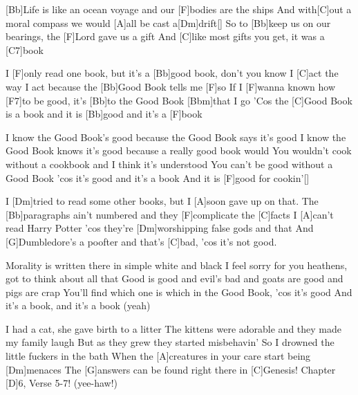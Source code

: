 

\begin{guitar}
	\small {}
	[Bb]Life is like an ocean voyage and our [F]bodies are the ships
	And with[C]out a moral compass we would [A]all be cast a[Dm]drift[]{}
	So to [Bb]keep us on our bearings, the [F]Lord gave us a gift
	And [C]like most gifts you get, it was a [C7]book
	
	I [F]only read one book, but it's a [Bb]good book, don't you know
	I [C]act the way I act because the [Bb]Good Book tells me [F]so
	If I [F]wanna known how [F7]to be good, it's [Bb]to the Good Book [Bbm]that I go
	'Cos the [C]Good Book is a book and it is [Bb]good and it's a [F]book
	
	I know the Good Book's good because the Good Book says it's good
	I know the Good Book knows it's good because a really good book would
	You wouldn't cook without a cookbook and I think it's understood
	You can't be good without a Good Book 'cos it's good and it's a book
	And it is [F]good for cookin'[]{}
	
	I [Dm]tried to read some other books, but I [A]soon gave up on that.
	The [Bb]paragraphs ain't numbered and they [F]complicate the [C]facts
	I [A]can't read Harry Potter 'cos they're [Dm]worshipping false gods and that
	And [G]Dumbledore's a poofter and that's [C]bad, 'cos it's not good.
	
	Morality is written there in simple white and black
	I feel sorry for you heathens, got to think about all that
	Good is good and evil's bad and goats are good and pigs are crap
	You'll find which one is which in the Good Book, 'cos it's good
	And it's a book, and it's a book (yeah)
	
	I had a cat, she gave birth to a litter
	The kittens were adorable and they made my family laugh
	But as they grew they started misbehavin'
	So I drowned the little fuckers in the bath
	When the [A]creatures in your care start being [Dm]menaces
	The [G]answers can be found right there in [C]Genesis!
	Chapter [D]6, Verse 5-7! (yee-haw!)
	

\end{guitar}
